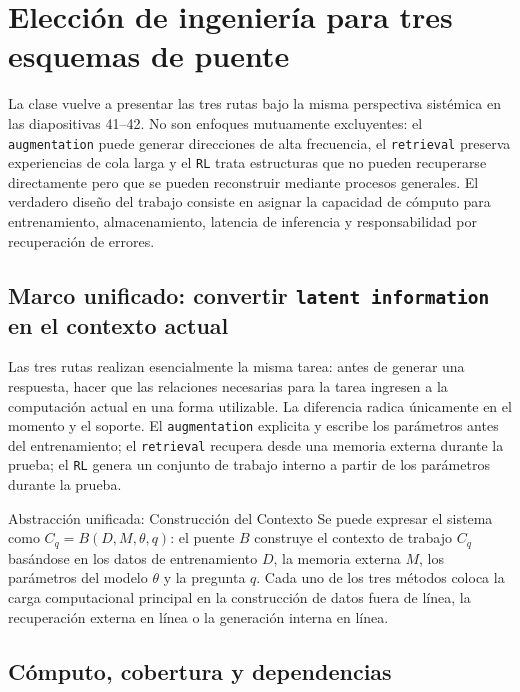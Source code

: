 \section{Elección de ingeniería para tres esquemas de puente}

La clase vuelve a presentar las tres rutas bajo la misma perspectiva sistémica en las diapositivas 41--42. No son enfoques mutuamente excluyentes: el \texttt{augmentation} puede generar direcciones de alta frecuencia, el \texttt{retrieval} preserva experiencias de cola larga y el \texttt{RL} trata estructuras que no pueden recuperarse directamente pero que se pueden reconstruir mediante procesos generales. El verdadero diseño del trabajo consiste en asignar la capacidad de cómputo para entrenamiento, almacenamiento, latencia de inferencia y responsabilidad por recuperación de errores.

\subsection{Marco unificado: convertir \texttt{latent information} en el contexto actual}

Las tres rutas realizan esencialmente la misma tarea: antes de generar una respuesta, hacer que las relaciones necesarias para la tarea ingresen a la computación actual en una forma utilizable. La diferencia radica únicamente en el momento y el soporte. El \texttt{augmentation} explicita y escribe los parámetros antes del entrenamiento; el \texttt{retrieval} recupera desde una memoria externa durante la prueba; el \texttt{RL} genera un conjunto de trabajo interno a partir de los parámetros durante la prueba.


\begin{importantbox}{Abstracción unificada: Construcción del Contexto}
Se puede expresar el sistema como $C_q=B(D,M,\theta,q)$: el puente $B$ construye el contexto de trabajo $C_q$ basándose en los datos de entrenamiento $D$, la memoria externa $M$, los parámetros del modelo $\theta$ y la pregunta $q$. Cada uno de los tres métodos coloca la carga computacional principal en la construcción de datos fuera de línea, la recuperación externa en línea o la generación interna en línea.
\end{importantbox}

\subsection{Cómputo, cobertura y dependencias}

